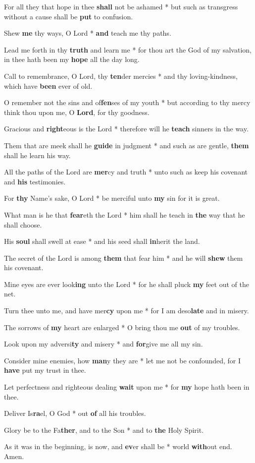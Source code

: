 \begin{multicols}{2}
	For all they that hope in thee \textbf{shall} not be ashamed * but such as transgress without a cause shall be \textbf{put} to confusion.
	
	Shew \textbf{me} thy ways, O Lord * \textbf{and} teach me thy paths.
	
	Lead me forth in thy \textbf{truth} and learn me * for thou art the God of my salvation, in thee hath been my \textbf{hope} all the day long.
	
	Call to remembrance, O Lord, thy \textbf{ten}der mercies * and thy loving-kindness, which have \textbf{been} ever of old.
	
	O remember not the sins and of\textbf{fen}ses of my youth * but according to thy mercy think thou upon me, O \textbf{Lord}, for thy goodness.
	
	Gracious and \textbf{right}eous is the Lord * therefore will he \textbf{teach} sinners in the way.
	
	Them that are meek shall he \textbf{guide} in judgment * and such as are gentle, \textbf{them} shall he learn his way.
	
	All the paths of the Lord are \textbf{mer}cy and truth * unto such as keep his covenant and \textbf{his} testimonies.
	
	For \textbf{thy} Name's sake, O Lord * be merciful unto \textbf{my} sin for it is great.
	
	What man is he that \textbf{fear}eth the Lord * him shall he teach in \textbf{the} way that he shall choose.
	
	His \textbf{soul} shall swell at ease * and his seed shall \textbf{in}herit the land.
	
	The secret of the Lord is among \textbf{them} that fear him * and he will \textbf{shew} them his covenant.
	
	Mine eyes are ever look\textbf{ing} unto the Lord * for he shall pluck \textbf{my} feet out of the net.
	
	Turn thee unto me, and have mer\textbf{cy} upon me * for I am deso\textbf{late }and in misery.
	
	The sorrows of \textbf{my} heart are enlarged * O bring thou me \textbf{out} of my troubles.
	
	Look upon my adversi\textbf{ty} and misery * and \textbf{for}give me all my sin.
	
	Consider mine enemies, how \textbf{man}y they are * let me not be confounded, for I \textbf{have} put my trust in thee.
	
	Let perfectness and righteous dealing \textbf{wait} upon me * for \textbf{my} hope hath been in thee.
	
	Deliver Is\textbf{ra}el, O God * out \textbf{of} all his troubles.
	
	Glory be to the Fa\textbf{ther}, and to the Son * and to \textbf{the} Holy Spirit.
	
	As it was in the beginning, is now, and \textbf{ev}er shall be * world \textbf{with}out end. Amen.
\end{multicols}